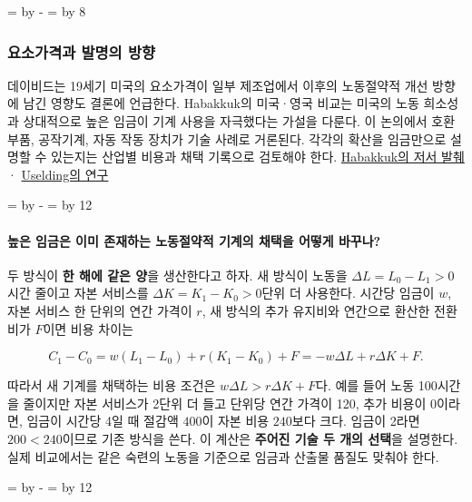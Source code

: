 \documentclass[10pt,a4paper]{article}
\newcommand{\ReserveQuestionSpace}{%
  \par\begingroup
  \dimen0=\pagegoal \advance\dimen0 by -\pagetotal
  \dimen2=\baselineskip \multiply\dimen2 by 12
  \ifdim\dimen0<\dimen2 \newpage\fi
  \endgroup}
\newcommand{\ReserveReadingSectionSpace}{%
  \par\begingroup
  \dimen0=\pagegoal \advance\dimen0 by -\pagetotal
  \dimen2=\baselineskip \multiply\dimen2 by 8
  \ifdim\dimen0<\dimen2 \newpage\fi
  \endgroup}
\begin{document}
\ReserveReadingSectionSpace
\subsubsection*{요소가격과 발명의 방향}

데이비드는 19세기 미국의 요소가격이 일부 제조업에서 이후의 노동절약적 개선 방향에 남긴 영향도 결론에 언급한다. Habakkuk의 미국·영국 비교는 미국의 노동 희소성과 상대적으로 높은 임금이 기계 사용을 자극했다는 가설을 다룬다. 이 논의에서 호환 부품, 공작기계, 자동 작동 장치가 기술 사례로 거론된다. 각각의 확산을 임금만으로 설명할 수 있는지는 산업별 비용과 채택 기록으로 검토해야 한다. \href{https://beckassets.blob.core.windows.net/product/readingsample/571249/9780521094474\_excerpt\_001.pdf}{Habakkuk의 저서 발췌} · \href{https://www.cambridge.org/core/journals/journal-of-economic-history/article/abs/factor-substitution-and-labor-productivity-growth-in-american-manufacturing-18391899/3A3C0FD2A4B8AE7DB1C0780C5C6D5CD1}{Uselding의 연구}\par

\ReserveQuestionSpace
\paragraph{높은 임금은 이미 존재하는 노동절약적 기계의 채택을 어떻게 바꾸나?}
두 방식이 \textbf{한 해에 같은 양}을 생산한다고 하자. 새 방식이 노동을 $\Delta L=L_0-L_1>0$시간 줄이고 자본 서비스를 $\Delta K=K_1-K_0>0$단위 더 사용한다. 시간당 임금이 $w$, 자본 서비스 한 단위의 연간 가격이 $r$, 새 방식의 추가 유지비와 연간으로 환산한 전환비가 $F$이면 비용 차이는\par

\[
C_1-C_0=w(L_1-L_0)+r(K_1-K_0)+F=-w\Delta L+r\Delta K+F.
\]

따라서 새 기계를 채택하는 비용 조건은 $w\Delta L>r\Delta K+F$다. 예를 들어 노동 100시간을 줄이지만 자본 서비스가 2단위 더 들고 단위당 연간 가격이 120, 추가 비용이 0이라면, 임금이 시간당 4일 때 절감액 $400$이 자본 비용 $240$보다 크다. 임금이 2라면 $200<240$이므로 기존 방식을 쓴다. 이 계산은 \textbf{주어진 기술 두 개의 선택}을 설명한다. 실제 비교에서는 같은 숙련의 노동을 기준으로 임금과 산출물 품질도 맞춰야 한다.\par

\ReserveQuestionSpace
\end{document}
